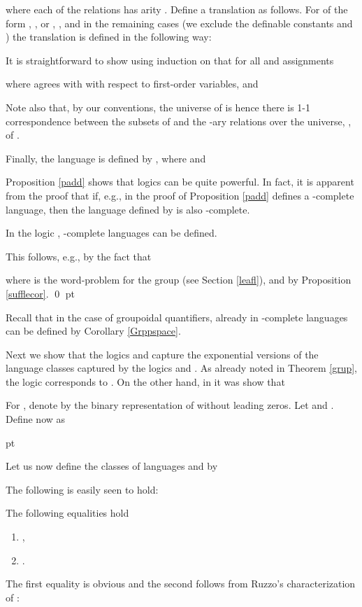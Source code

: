 \documentclass{LMCS}
\begin{document}
where each of the relations  has arity .  Define a translation     as follows. For  of the form ,  , or , , and in the remaining  cases (we exclude the definable constants  and ) the translation is defined in the following way:

It is straightforward to show using induction on   that for all  and assignments 

where  agrees with  with respect to first-order variables, and 

 Note also that, by our conventions, the universe of   is   hence there is 1-1 correspondence between the subsets of 
 and the -ary relations over the universe, , of .

Finally, the language  is defined by , where  and 


\noindent Proposition \ref{padd} shows that logics
 can be quite powerful. In fact, it is apparent
from the proof that if, e.g.,  in the
proof of Proposition \ref{padd} defines a -complete language,
then the language defined by  is
also -complete.


\begin{cor}\label{monpspace} In the logic ,  -complete languages can be defined.  
\end{cor}
\proof  This follows, e.g., by the fact that 

where  is the word-problem for the group  (see Section \ref{leafl}), and by Proposition \ref{sufflecor}.
\qed{} pt

\noindent Recall that in the case of groupoidal quantifiers, already
in  -complete languages can be defined by
Corollary \ref{Grppspace}.

Next we show that the logics  and  capture the exponential versions of the language classes captured by the logics   and . As already noted in Theorem \ref{grup},  the logic  corresponds to   \cite{lamcscvo01}. On the other hand, in  \cite{baimst90} it was show that 

\begin{defi} For , denote by  the binary representation of  without leading zeros. Let   and . Define now  as
  
\end{defi} pt

\noindent Let us now define the classes of languages
 and  by

The following is easily seen to hold:
\begin{prop}\label{easy}The following equalities hold
\begin{enumerate}[\em(1)]
\item ,
\item .
\end{enumerate}
\end{prop}
\proof
The first equality is obvious and the second follows from Ruzzo's characterization  of : 
\end{document}
